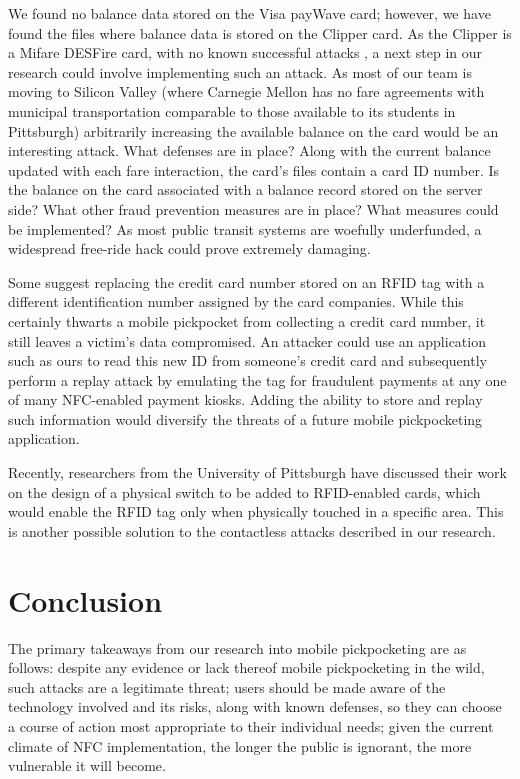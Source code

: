 \documentclass{sig-alternate}
\begin{document}
We found no balance data stored on the Visa payWave card; however, we have found the files where balance data is stored on the Clipper card.  As the Clipper is a Mifare DESFire card, with no known successful attacks \cite{farebot-1}, a next step in our research could involve implementing such an attack.  As most of our team is moving to Silicon Valley (where Carnegie Mellon has no fare agreements with municipal transportation comparable to those available to its students in Pittsburgh) arbitrarily increasing the available balance on the card would be an interesting attack.  What defenses are in place?  Along with the current balance updated with each fare interaction, the card's files contain a card ID number.  Is the balance on the card associated with a balance record stored on the server side?  What other fraud prevention measures are in place?  What measures could be implemented?  As most public transit systems are woefully underfunded, a widespread free-ride hack could prove extremely damaging.

Some suggest replacing the credit card number stored on an RFID tag with a different identification number assigned by the card companies. While this certainly thwarts a mobile pickpocket from collecting a credit card number, it still leaves a victim's data compromised. An attacker could use an application such as ours to read this new ID from someone's credit card and subsequently perform a replay attack by emulating the tag for fraudulent payments at any one of many NFC-enabled payment kiosks.  Adding the ability to store and replay such information would diversify the threats of a future mobile pickpocketing application.  

Recently, researchers from the University of Pittsburgh have discussed their work on the design of a physical switch to be added to RFID-enabled cards, which would enable the RFID tag only when physically touched in a specific area. This is another possible solution to the contactless attacks described in our research. \cite{upitt-rfid-switch}

\section{Conclusion}
The primary takeaways from our research into mobile pickpocketing are as follows:  despite any evidence or lack thereof mobile pickpocketing in the wild, such attacks are a legitimate threat; users should be made aware of the technology involved and its risks, along with known defenses, so they can choose a course of action most appropriate to their individual needs; given the current climate of NFC implementation, the longer the public is ignorant, the more vulnerable it will become.
\end{document}
